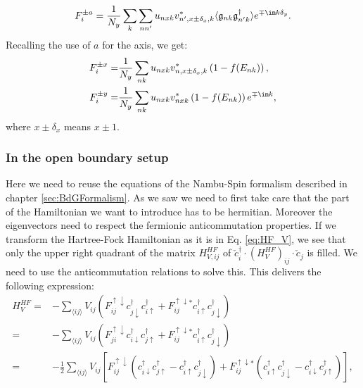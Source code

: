 \documentclass[../main.tex]{subfile}
\begin{document}
\begin{equation}\label{eq:transfo_F_x}
    F^{\pm a}_i =\frac{1}{N_y}\sum_{k}\sum_{nn'} u_{nx k}v_{n',x \pm \delta_x,k}^{\ast} \langle \mathfrak{g}_{nk} \mathfrak{g}_{n'k}^{\dagger} \rangle e^{\mp\im k \delta_y}.
\end{equation}
Recalling the use of $a$ for the axis, we get:
\begin{align}
    F^{\pm x}_i =& \frac{1}{N_y} \sum_{nk} u_{nx k} v_{n,x\pm \delta_x,k}^{\ast}\left(1 - f(E_{nk})\right),\\
    F^{\pm y}_i =& \frac{1}{N_y} \sum_{nk} u_{nx k} v_{n x k}^{\ast}\left(1 - f(E_{nk})\right) e^{\mp \im k},
\end{align}
where $x\pm \delta_x$ means $x\pm1$.


\subsubsection{In the open boundary setup}
Here we need to reuse the equations of the Nambu-Spin formalism described in chapter \ref{sec:BdGFormalism}. As we saw we need to first
take care that the part of the Hamiltonian we want to introduce has to be hermitian. Moreover the eigenvectors need to respect the fermionic
anticommutation properties.
If we transform the Hartree-Fock Hamiltonian as it is in Eq. \ref{eq:HF_V}, we see that only the upper right quadrant of the matrix $H_{V,ij}^{HF}$ 
of $\check{c}_i^{\dagger} \cdot (H_{V}^{HF})_{ij}\cdot \check{c}_j $ is filled. We need to use the anticommutation relations to solve this.
This delivers the following expression:
\begin{equation}
    \begin{aligned}
    H_V^{HF} =& -\sum_{\langle ij\rangle} V_{ij} \left(F_{ij}^{\uparrow \downarrow} c_{j\downarrow}^{\dagger}c_{i\uparrow}^{\dagger} +
     F_{ij}^{\uparrow \downarrow\ast} c_{i\uparrow}^{\dagger}c_{j\downarrow}^{\dagger}\right)\\
     =& -\sum_{\langle ij\rangle} V_{ij} \left(F_{ji}^{\uparrow \downarrow} c_{i\downarrow}^{\dagger}c_{j\uparrow}^{\dagger} +
     F_{ij}^{\uparrow \downarrow\ast} c_{i\uparrow}^{\dagger}c_{j\downarrow}^{\dagger}\right)\\
     =& -\frac{1}{2}\sum_{\langle ij\rangle} V_{ij} \left[F_{ij}^{\uparrow \downarrow} \left(c_{i\downarrow}^{\dagger}c_{j\uparrow}^{\dagger} - c_{i\uparrow}^{\dagger}c_{j\downarrow}^{\dagger}\right)
     + F_{ij}^{\uparrow \downarrow\ast}  \left(c_{i\uparrow}^{\dagger}c_{j\downarrow}^{\dagger} - c_{i\downarrow}^{\dagger}c_{j\uparrow}^{\dagger}\right)\right],
    \end{aligned}
\end{equation} 
\end{document}

